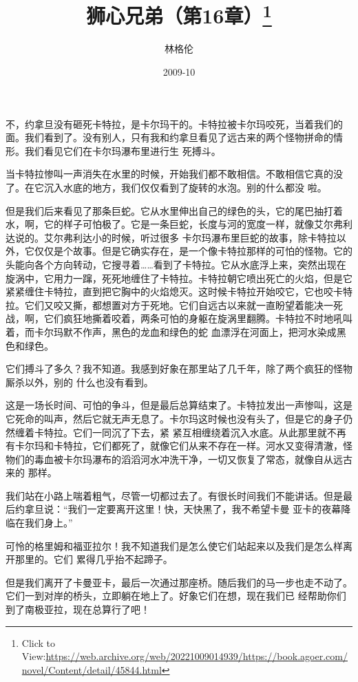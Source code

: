 \documentclass{article}
\title{狮心兄弟（第16章）\footnote{Click to View:\url{https://web.archive.org/web/20221009014939/https://book.agoer.com/novel/Content/detail/45844.html}}}
\author{林格伦}
\date{2009-10}
\begin{document}

\maketitle


\Large

﻿不，约拿旦没有砸死卡特拉，是卡尔玛干的。卡特拉被卡尔玛咬死，当着我们的面。我们看到了。没有别人，只有我和约拿旦看见了远古来的两个怪物拼命的情形。我们看见它们在卡尔玛瀑布里进行生
死搏斗。 

当卡特拉惨叫一声消失在水里的时候，开始我们都不敢相信。不敢相信它真的没了。在它沉入水底的地方，我们仅仅看到了旋转的水泡。别的什么都没
啦。 

但是我们后来看见了那条巨蛇。它从水里伸出自己的绿色的头，它的尾巴抽打着水，啊，它的样子可怕极了。它是一条巨蛇，长度与河的宽度一样，就像艾尔弗利达说的。艾尔弗利达小的时候，听过很多
\newpage
卡尔玛瀑布里巨蛇的故事，除卡特拉以外，它仅仅是个故事。但是它确实存在，是一个像卡特拉那样的可怕的怪物。它的头能向各个方向转动，它搜寻着……看到了卡特拉。它从水底浮上来，突然出现在旋涡中，它用力一蹿，死死地缠住了卡特拉。卡特拉朝它喷出死亡的火焰，但是它紧紧缠住卡特拉，直到把它胸中的火焰熄灭。这时候卡特拉开始咬它，它也咬卡特拉。它们又咬又撕，都想置对方于死地。它们自远古以来就一直盼望着能决一死战，啊，它们疯狂地撕着咬着，两条可怕的身躯在旋涡里翻腾。卡特拉不时地吼叫着，而卡尔玛默不作声，黑色的龙血和绿色的蛇
血漂浮在河面上，把河水染成黑色和绿色。 

它们搏斗了多久？我不知道。我感到好象在那里站了几千年，除了两个疯狂的怪物厮杀以外，别的
什么也没有看到。 

这是一场长时间、可怕的争斗，但是最后总算结束了。卡特拉发出一声惨叫，这是它死命的叫声，然后它就无声无息了。卡尔玛这时候也没有头了，但是它的身子仍然缠着卡特拉。它们一同沉了下去，紧
\newpage
紧互相缠绕着沉入水底。从此那里就不再有卡尔玛和卡特拉，它们都死了，就像它们从来不存在一样。河水又变得清澈，怪物们的毒血被卡尔玛瀑布的滔滔河水冲洗干净，一切又恢复了常态，就像自从远古来的
那样。 

我们站在小路上喘着粗气，尽管一切都过去了。有很长时间我们不能讲话。但是最后约拿旦说：“我们一定要离开这里！快，天快黑了，我不希望卡曼
亚卡的夜幕降临在我们身上。” 

可怜的格里姆和福亚拉尔！我不知道我们是怎么使它们站起来以及我们是怎么样离开那里的。它们
累得几乎抬不起蹄子。 

但是我们离开了卡曼亚卡，最后一次通过那座桥。随后我们的马一步也走不动了。它们一到对岸的桥头，立即躺在地上了。好象它们在想，现在我们已
经帮助你们到了南极亚拉，现在总算行了吧！ 
\end{document}
